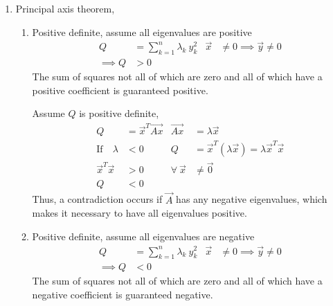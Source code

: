 \begin{enumerate}
    \item Principal axis theorem,
          \begin{enumerate}
              \item Positive definite, assume all eigenvalues are positive
                    \begin{align}
                        Q          & = \sum_{k=1}^{n} \lambda_k\ y_k^2 &
                        \vec{x}    & \neq 0 \implies \vec{y} \neq 0      \\
                        \implies Q & > 0
                    \end{align}
                    The sum of squares not all of which are zero and all of which have
                    a positive coefficient is guaranteed positive. \par

                    Assume $ Q $ is positive definite,
                    \begin{align}
                        Q                        & = \vec{x}^T \vec{Ax}          &
                        \vec{Ax}                 & = \lambda \vec{x}               \\
                        \text{If} \quad  \lambda & < 0                           &
                        Q                        & = \vec{x}^T (\lambda \vec{x})
                        = \lambda \vec{x}^T \vec{x}                                \\
                        \vec{x}^T \vec{x}        & > 0                           &
                        \forall\ \vec{x}         & \neq \vec{0}                    \\
                        Q                        & < 0
                    \end{align}
                    Thus, a contradiction occurs if $ \vec{A} $ has any negative
                    eigenvalues, which makes it necessary to have all eigenvalues
                    positive.

              \item Positive definite, assume all eigenvalues are negative
                    \begin{align}
                        Q          & = \sum_{k=1}^{n} \lambda_k\ y_k^2 &
                        \vec{x}    & \neq 0 \implies \vec{y} \neq 0      \\
                        \implies Q & < 0
                    \end{align}
                    The sum of squares not all of which are zero and all of which have
                    a negative coefficient is guaranteed negative. \par


\end{enumerate}
\end{enumerate}
